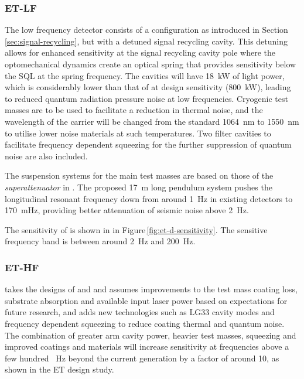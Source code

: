 \subsubsection{ET-LF}
The low frequency detector consists of a \DRFPMI{} configuration as introduced in Section\,\ref{sec:signal-recycling}, but with a detuned signal recycling cavity. This detuning allows for enhanced sensitivity at the signal recycling cavity pole where the optomechanical dynamics create an optical spring that provides sensitivity below the \gls{SQL} at the spring frequency. The cavities will have \SI{18}{\kilo\watt} of light power, which is considerably lower than that of \ALIGO{} at design sensitivity (\SI{800}{\kilo\watt}), leading to reduced quantum radiation pressure noise at low frequencies. Cryogenic test masses are to be used to facilitate a reduction in thermal noise, and the wavelength of the carrier will be changed from the standard \SI{1064}{\nano\meter} to \SI{1550}{\nano\meter} to utilise lower noise materials at such temperatures. Two filter cavities to facilitate frequency dependent squeezing for the further suppression of quantum noise are also included.

The suspension systems for the main test masses are based on those of the \emph{superattenuator} in \VIRGO{} \cite{Acernese2010}. The proposed \SI{17}{\meter} long pendulum system pushes the longitudinal resonant frequency down from around \SI{1}{\hertz} in existing detectors to \SI{170}{\milli\hertz}, providing better attenuation of seismic noise above \SI{2}{\hertz}.

The sensitivity of \ETLF{} is shown in  in Figure\,\ref{fig:et-d-sensitivity}. The sensitive frequency band is between around \SI{2}{\hertz} and \SI{200}{\hertz}.

\subsubsection{ET-HF}
\ETHF{} takes the designs of \ALIGO{} and \AVIRGO{} and assumes improvements to the test mass coating loss, substrate absorption and available input laser power based on expectations for future research, and adds new technologies such as LG33 cavity modes \cite{Carbone2013} and frequency dependent squeezing \cite{Kimble2001} to reduce coating thermal and quantum noise. The combination of greater arm cavity power, heavier test masses, squeezing and improved coatings and materials will increase sensitivity at frequencies above a few hundred \SI{}{\hertz} beyond the current generation by a factor of around \num{10}, as shown in the \gls{ET} design study.

